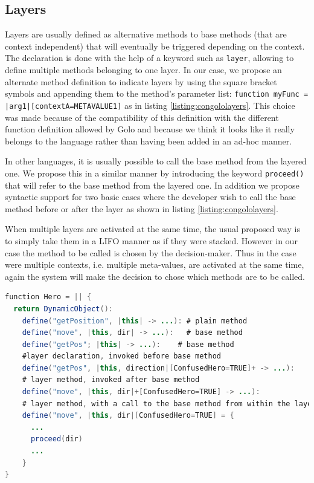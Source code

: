 \documentclass[a4paper]{article}
\begin{document}
\subsection{Layers}
\label{subsection:layers}
Layers are usually defined as alternative methods to base methods (that are context independent) that will eventually be triggered depending on the context. The declaration is done with the help of a keyword such as \lstinline|layer|, allowing to define multiple methods belonging to one layer. In our case, we propose an alternate method definition to indicate layers by using the square bracket symbols and appending them to the method's parameter list: \lstinline!function myFunc = |arg1|[contextA=METAVALUE1]! as in listing \ref{listing:congololayers}. This choice was made because of the compatibility of this definition with the different function definition allowed by Golo and because we think it looks like it really belongs to the language rather than having been added in an ad-hoc manner.

In other languages, it is usually possible to call the base method from the layered one. We propose this in a similar manner by introducing the keyword \lstinline|proceed()| that will refer to the base method from the layered one. In addition we propose syntactic support for two basic cases where the developer wish to call the base method before or after the layer as shown in listing \ref{listing:congololayers}.

When multiple layers are activated at the same time, the usual proposed way is to simply take them in a LIFO manner as if they were stacked. However in our case the method to be called is chosen by the decision-maker. Thus in the case were multiple contexts, i.e. multiple meta-values, are activated at the same time, again the system will make the decision to chose which methods are to be called.

\begin{lstlisting}[float, language=Java, caption=ConGolo layers example, label={listing:congololayers}]
function Hero = || {
  return DynamicObject():
    define("getPosition", |this| -> ...): # plain method
    define("move", |this, dir| -> ...):   # base method
    define("getPos"; |this| -> ...):    # base method
    #layer declaration, invoked before base method
    define("getPos", |this, direction|[ConfusedHero=TRUE]+ -> ...):
    # layer method, invoked after base method
    define("move", |this, dir|+[ConfusedHero=TRUE] -> ...):
    # layer method, with a call to the base method from within the layer
    define("move", |this, dir|[ConfusedHero=TRUE] = {
      ...
      proceed(dir)
      ...
    }
}
\end{lstlisting}
\end{document}
